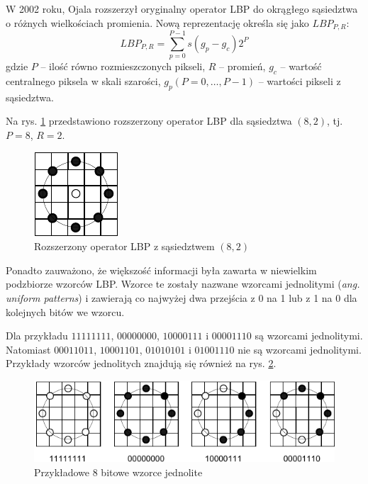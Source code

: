 W 2002 roku, Ojala rozszerzył oryginalny operator LBP do okrągłego sąsiedztwa o różnych wielkościach promienia.\cite{OJALA02} Nową reprezentację określa się jako $LBP_{P, R}$:
\begin{equation} 
\label{lbp_lbp_pr} 
LBP_{P, R} = \sum\limits_{p=0}^{P-1} s(g_p - g_c) 2^P
\end{equation} gdzie $P$ -- ilość równo rozmieszczonych pikseli, $R$ -- promień, $g_c$ --  wartość centralnego piksela w skali szarości, $g_p (P = 0, \ldots, P-1)$ -- wartości pikseli z sąsiedztwa.

Na rys. \ref{fig:lbp-pr-operator} przedstawiono rozszerzony operator LBP dla sąsiedztwa $(8, 2)$, tj. $P = 8$, $R = 2$.

\begin{figure}[h]
	\centering
	\includegraphics[scale=2.0]{graphics/01_podstawy_teoretyczne/lbp-pr-operator.pdf}
	\caption{ Rozszerzony operator LBP z sąsiedztwem $(8, 2)$ \cite{HEUSCH06} }
	\label{fig:lbp-pr-operator}
\end{figure}

Ponadto zauważono, że większość informacji była zawarta w niewielkim podzbiorze wzorców LBP. Wzorce te zostały nazwane wzorcami jednolitymi (\emph{ang. uniform patterns}) i zawierają co najwyżej dwa przejścia z 0 na 1 lub z 1 na 0 dla kolejnych bitów we wzorcu. 

Dla przykładu $11111111$, $00000000$, $10000111$ i $00001110$ są wzorcami jednolitymi. Natomiast $00011011$, $10001101$, $01010101$ i $01001110$ nie są wzorcami jednolitymi. Przykłady wzorców jednolitych znajdują się również na rys. \ref{fig:lbp-uniform-patterns}.

\begin{figure}[h]
	\centering
	\includegraphics[scale=1.8]{graphics/01_podstawy_teoretyczne/lbp-uniform-patterns.pdf}
	\caption{ Przykładowe 8 bitowe wzorce jednolite }
	\label{fig:lbp-uniform-patterns}
\end{figure}

